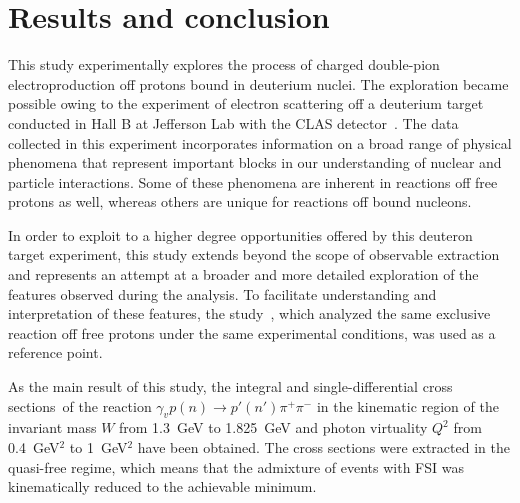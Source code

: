 \chapter{Results and conclusion}
\label{Sect:concl}
\vspace{-0.25em}



This study experimentally explores the process of charged double-pion electroproduction off protons bound in deuterium nuclei. The exploration became possible owing to the experiment of electron scattering off a deuterium target conducted in Hall B at Jefferson Lab with the CLAS detector~\cite{Mecking:2003zu}. The data collected in this experiment incorporates information on a broad range of physical phenomena that represent important blocks in our understanding of nuclear and particle interactions. Some of these phenomena are inherent in reactions off free protons as well, whereas others are unique for reactions off bound nucleons. 

In order to exploit to a higher degree opportunities offered by this deuteron target experiment, this study extends beyond the scope of observable extraction and represents an attempt at a broader and more detailed exploration of the features observed during the analysis. To facilitate understanding and interpretation of these features, the study~\cite{Fed_an_note:2017,Fed_paper_2018}, which analyzed the same exclusive reaction off free protons under the same experimental conditions, was used as a reference point. 

As the main result of this study, the integral and single-differential cross sections~of the reaction $\gamma_{v}p(n) \rightarrow p' (n')\pi^{+}\pi^{-}$ in the kinematic region of the invariant mass $W$ from 1.3~GeV to 1.825~GeV and photon virtuality $Q^{2}$ from 0.4~GeV$^2$ to 1~GeV$^2$ have been obtained. The cross sections were extracted in the quasi-free regime, which means that the admixture of events with FSI was kinematically reduced to the achievable minimum.

